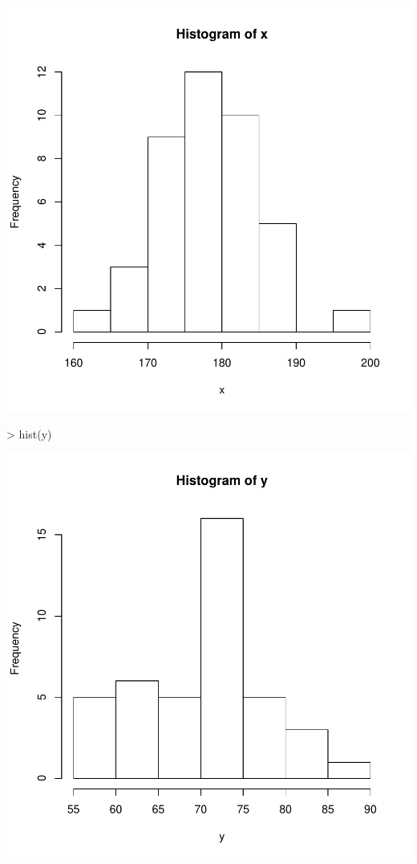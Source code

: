 \documentclass[12pt]{article}
\begin{document}
\includegraphics{ensayo-007}
\begin{Schunk}
\begin{Sinput}
> hist(y)
\end{Sinput}
\end{Schunk}
\includegraphics{ensayo-008}
\end{document}

